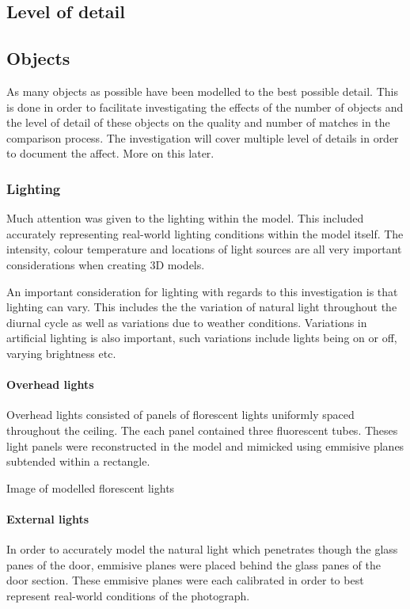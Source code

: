 \documentclass[11pt,a4paper]{report}
\begin{document}
		\subsection{Level of detail}
			\subsection{Objects}
				As many objects as possible have been modelled to the best possible detail. This is done in order to facilitate investigating the effects of the number of objects and the level of detail of these objects on the quality and number of matches in the comparison process. The investigation will cover multiple level of details in order to document the affect. More on this later.
			\subsubsection{Lighting}
				Much attention was given to the lighting within the model. This included accurately representing real-world lighting conditions within the model itself. The intensity, colour temperature and locations of light sources are all very important considerations when creating 3D models.
				
				An important consideration for lighting with regards to this investigation is that lighting can vary. This includes the the variation of natural light throughout the diurnal cycle as well as variations due to weather conditions. Variations in artificial lighting is also important, such variations include lights being on or off, varying brightness etc.
				\paragraph{Overhead lights}
					Overhead lights consisted of panels of florescent lights uniformly spaced throughout the ceiling. The each panel contained three fluorescent tubes. Theses light panels were reconstructed in the model and mimicked using emmisive planes subtended within a rectangle.
					
					{{Image of modelled florescent lights}}
				
				\paragraph{External lights}
					In order to accurately model the natural light which penetrates though the glass panes of the door, emmisive planes were placed behind the glass panes of the door section. These emmisive planes were each calibrated in order to best represent real-world conditions of the photograph.
					
\end{document}
